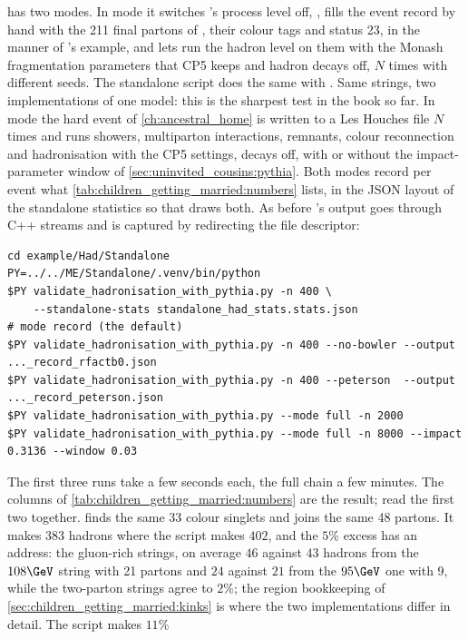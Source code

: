  has two modes. In mode
 it switches \PYTHIA's process level off,
, fills the event record by hand with the 211
final partons of , their colour tags and status 23, in
the manner of \PYTHIA's  example, and lets  run
the hadron level on them with the Monash fragmentation parameters that CP5
keeps and hadron decays off, $N$ times with different seeds. The standalone
script does the same with . Same strings, two
implementations of one model: this is the sharpest test in the book so
far. In mode  the hard event of \cref{ch:ancestral_home} is
written to a Les Houches file $N$ times and \PYTHIA runs showers,
multiparton interactions, remnants, colour reconnection and hadronisation
with the CP5 settings, decays off, with or without the impact-parameter
window of \cref{sec:uninvited_cousins:pythia}. Both modes record per event
what \cref{tab:children_getting_married:numbers} lists, in the JSON layout
of the standalone statistics so that  draws both.
As before \PYTHIA's output goes through C++ streams and is captured by
redirecting the file descriptor:
\begin{verbatim}
cd example/Had/Standalone
PY=../../ME/Standalone/.venv/bin/python
$PY validate_hadronisation_with_pythia.py -n 400 \
    --standalone-stats standalone_had_stats.stats.json                  # mode record (the default)
$PY validate_hadronisation_with_pythia.py -n 400 --no-bowler --output ..._record_rfactb0.json
$PY validate_hadronisation_with_pythia.py -n 400 --peterson  --output ..._record_peterson.json
$PY validate_hadronisation_with_pythia.py --mode full -n 2000
$PY validate_hadronisation_with_pythia.py --mode full -n 8000 --impact 0.3136 --window 0.03
\end{verbatim}
The first three runs take a few seconds each, the full chain a few minutes.
The columns of \cref{tab:children_getting_married:numbers} are the result;
read the first two together. \PYTHIA finds the same 33 colour singlets and
joins the same 48 partons. It makes $383$ hadrons where the script makes
$402$, and the $5\%$ excess has an address: the gluon-rich strings, on
average $46$ against $43$ hadrons from the $108\GeV$ string with 21 partons
and $24$ against $21$ from the $95\GeV$ one with 9, while the two-parton
strings agree to $2\%$; the region bookkeeping of \cref{sec:children_getting_married:kinks}
is where the two implementations differ in detail. The script makes $11\%$
